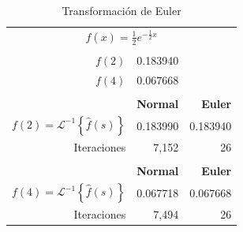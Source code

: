 \documentclass[11pt]{article}
\numberwithin{equation}{section} %
\begin{document}
\begin{table}[htbp]
\centering
\caption{Transformación de Euler}
\begin{tabular}{r r r}
\multicolumn{3}{c}{$f(x)=\frac{1}{2}e^{-\frac{1}{2}x}$} \\
\\
$f(2)$ & 0.183940 & \\
$f(4)$ & 0.067668 & \\
\\
& \bf{Normal} & \bf{Euler} \\
$f(2)=\mathcal{L}^{-1}\left\{\hat{f}(s)\right\}$ & 0.183990 & 0.183940 \\
Iteraciones & 7,152 & 26 \\
\\
& \bf{Normal} & \bf{Euler} \\
$f(4)=\mathcal{L}^{-1}\left\{\hat{f}(s)\right\}$ & 0.067718 & 0.067668 \\
Iteraciones & 7,494 & 26 \\
\end{tabular}%
\label{tab:euler}%
\end{table}%

\clearpage

\nocite{*}



\end{document}
